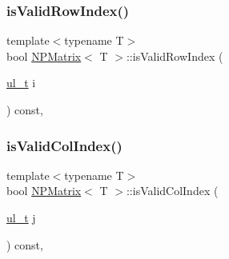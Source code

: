 \mbox{\label{class_n_p_matrix_afc5221cb1f5d1e1919801a0ff32751fe}} 
\subsubsection{\texorpdfstring{isValidRowIndex()}{isValidRowIndex()}}
{\footnotesize\ttfamily template$<$typename T$>$ \\
bool \mbox{\hyperlink{class_n_p_matrix}{N\+P\+Matrix}}$<$ T $>$\+::is\+Valid\+Row\+Index (\begin{DoxyParamCaption}\item[{\mbox{\hyperlink{group___n_algebra_ga1b140a2034db3f5dfe18a987745df43a}{ul\+\_\+t}}}]{i }\end{DoxyParamCaption}) const\hspace{0.3cm}{\ttfamily [inline]}, {\ttfamily [protected]}}

\mbox{\label{class_n_p_matrix_ab3f19d6c9259ef6e0a919ea7ad85a5a1}} 
\subsubsection{\texorpdfstring{isValidColIndex()}{isValidColIndex()}}
{\footnotesize\ttfamily template$<$typename T$>$ \\
bool \mbox{\hyperlink{class_n_p_matrix}{N\+P\+Matrix}}$<$ T $>$\+::is\+Valid\+Col\+Index (\begin{DoxyParamCaption}\item[{\mbox{\hyperlink{group___n_algebra_ga1b140a2034db3f5dfe18a987745df43a}{ul\+\_\+t}}}]{j }\end{DoxyParamCaption}) const\hspace{0.3cm}{\ttfamily [inline]}, {\ttfamily [protected]}}

\mbox{\label{class_n_p_matrix_a3d584ab75f97711997f39ffefef1f78b}} 
